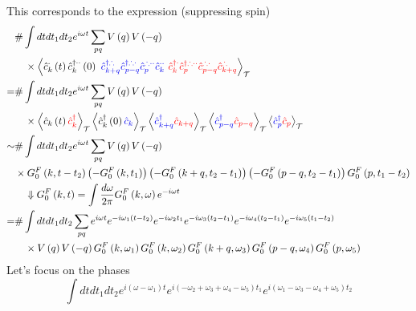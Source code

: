 This corresponds to the expression (suppressing spin)
\begin{align*}
    &\#\int{dtdt_1dt_2e^{i\omega t}\sum_{pq}{V\left( q \right) V\left( -q \right)}}\\
    &\quad\times \left< \hat{c}_{k}^{\cdot}\left( t \right) \hat{c}_{k}^{\dagger \cdot \cdot}\left( 0 \right) \,\,{\color[RGB]{0, 0, 240} \hat{c}_{k+q}^{\dagger \therefore}\hat{c}_{p-q}^{\dagger \therefore \cdot}\hat{c}_{p}^{\therefore \cdot \cdot}\hat{c}_{k}^{\cdot \cdot}}\,\,{\color{red} \hat{c}_{k}^{\dagger \cdot}\hat{c}_{p}^{\dagger \therefore \cdot \cdot}\hat{c}_{p-q}^{\therefore \cdot}\hat{c}_{k+q}^{\therefore}} \right> _{\mathcal{T}}\\
    =&\#\int{dtdt_1dt_2e^{i\omega t}\sum_{pq}{V\left( q \right) V\left( -q \right)}}\\
    &\quad\times \left< \hat{c}_k\left( t \right) {\color{red} \hat{c}_{k}^{\dagger}} \right> _{\mathcal{T}}\left< \hat{c}_{k}^{\dagger}\left( 0 \right) {\color[RGB]{0, 0, 240} \hat{c}_k} \right> _{\mathcal{T}}\left< {\color[RGB]{0, 0, 240} \hat{c}_{k+q}^{\dagger}}{\color{red} \hat{c}_{k+q}} \right> _{\mathcal{T}}\left< {\color[RGB]{0, 0, 240} \hat{c}_{p-q}^{\dagger}}{\color{red} \hat{c}_{p-q}} \right> _{\mathcal{T}}\left< {\color[RGB]{0, 0, 240} \hat{c}_{p}^{\dagger}}{\color{red} \hat{c}_p} \right> _{\mathcal{T}}\\
    \sim& \#\int{dtdt_1dt_2e^{i\omega t}\sum_{pq}{V\left( q \right) V\left( -q \right)}}\\
    &\times G_{0}^{F}\left( k,t-t_2 \right) \left( -G_{0}^{F}\left( k,t_1 \right) \right) \left( -G_{0}^{F}\left( k+q,t_2-t_1 \right) \right) \left( -G_{0}^{F}\left( p-q,t_2-t_1 \right) \right) G_{0}^{F}\left( p,t_1-t_2 \right) \\
    &\quad\Downarrow G_{0}^{F}\left( k,t \right) =\int{\frac{d\omega}{2\pi}G_{0}^{F}\left( k,\omega \right) e^{-i\omega t}}\\
    =&\#\int{dtdt_1dt_2\sum_{pq}{e^{i\omega t}e^{-i\omega _1\left( t-t_2 \right)}e^{-i\omega _2t_1}e^{-i\omega _3\left( t_2-t_1 \right)}e^{-i\omega _4\left( t_2-t_1 \right)}e^{-i\omega _5\left( t_1-t_2 \right)}}}\\
    &\quad \times V\left( q \right) V\left( -q \right) G_0^F\left( k,\omega _1 \right) G_0^F\left( k,\omega _2 \right) G_0^F\left( k+q,\omega _3 \right) G_0^F\left( p-q,\omega _4 \right) G_0^F\left( p,\omega _5 \right)
\end{align*}
Let's focus on the phases
\[ \int{dtdt_1dt_2e^{i\left( \omega -\omega _1 \right) t}e^{i\left( -\omega _2+\omega _3+\omega _4-\omega _5 \right) t_1}e^{i\left( \omega _1-\omega _3-\omega _4+\omega _5 \right) t_2}}\]
